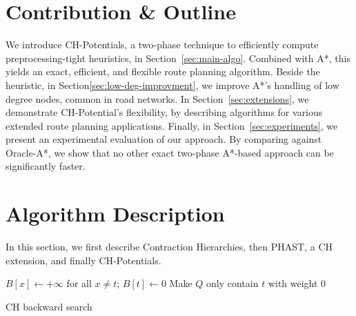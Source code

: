 \documentclass[letterpaper]{article} %
\begin{document}
\section{Contribution \& Outline}

We introduce CH-Potentials, a two-phase technique to efficiently compute preprocessing-tight heuristics, in Section~\ref{sec:main-algo}.
Combined with A*, this yields an exact, efficient, and flexible route planning algorithm.
Beside the heuristic, in Section\ref{sec:low-deg-improvment}, we improve A*'s handling of low degree nodes, common in road networks.
In Section~\ref{sec:extensions}, we demonstrate CH-Potential's flexibility, by describing algorithms for various extended route planning applications.
Finally, in Section~\ref{sec:experiments}, we present an experimental evaluation of our approach.
By comparing against Oracle-A*, we show that no other exact two-phase A*-based approach can be significantly faster.

\section{Algorithm Description}

In this section, we first describe Contraction Hierarchies, then PHAST, a CH extension, and finally CH-Potentials.

\label{sec:main-algo}

\begin{algorithm2e}
$B[x] \leftarrow +\infty$ for all $x\neq t$;
$B[t] \leftarrow 0$\;
Make $Q$ only contain $t$ with weight $0$\;
\caption{CH backward search}
\label{algo:ch-backward}
\end{algorithm2e}
\end{document}
